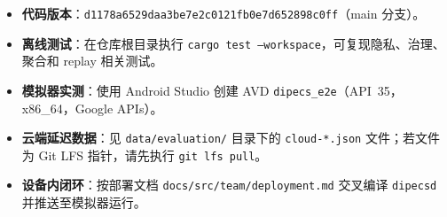 \documentclass[12pt,a4paper]{article}
\begin{document}
\begin{itemize}
  \item \textbf{代码版本}：\texttt{d1178a6\allowbreak 529daa3b\allowbreak e7e2c012\allowbreak 1fb0e7d6\allowbreak 52898c0ff}（main 分支）。
  \item \textbf{离线测试}：在仓库根目录执行 \texttt{cargo test --workspace}，可复现隐私、治理、聚合和 replay 相关测试。
  \item \textbf{模拟器实测}：使用 Android Studio 创建 AVD \texttt{dipecs\_e2e}（API~35，x86\_64，Google APIs）\cite{android-emulator,android-api-35}。
  \item \textbf{云端延迟数据}：见 \texttt{data/evaluation/} 目录下的 \texttt{cloud-*.json} 文件；若文件为 Git LFS 指针，请先执行 \texttt{git lfs pull}。
  \item \textbf{设备内闭环}：按部署文档 \texttt{docs/\allowbreak src/\allowbreak team/\allowbreak deployment.md} 交叉编译 \texttt{dipecsd} 并推送至模拟器运行。
\end{itemize}



\end{document}
